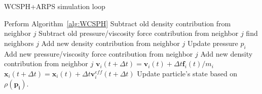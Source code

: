 \newpage

\begin{algorithm}[H]
    \caption[ARPS: WCSPH+ARPS simulation]{WCSPH+ARPS simulation loop}
    \label{alg:WCSPHARPS}
    \begin{algorithmic}
        \State Perform Algorithm~\ref{alg:WCSPH}
        \Else
            \State Subtract old density contribution from neighbor $j$
	        \State Subtract old pressure/viscosity force contribution from neighbor $j$
            \EndFor
            \State find neighbors $j$
            \EndFor
            \State Add new density contribution from neighbor $j$
            \State Update pressure $p_{i}$
	        \State Add new pressure/viscosity force contribution from neighbor $j$
            \State Add new density contribution from neighbor $j$
            \EndFor
            \State $\mathbf{v}_{i}(t+\Delta t) = \mathbf{v}_{i}(t) + \Delta t \mathbf{f}_{i}(t)/m_{i}$
            \State $\mathbf{x}_{i}(t+\Delta t) = \mathbf{x}_{i}(t) + \Delta t \mathbf{v}^{eff}_{i}(t+\Delta t)$
            \State Update particle's state based on $\rho(\mathbf{p_{i}})$.
            \EndFor
        \EndIf
    \end{algorithmic}
\end{algorithm}

\newpage 

